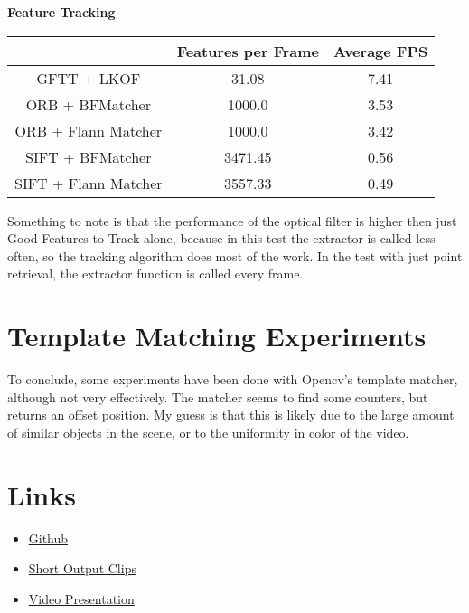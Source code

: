\documentclass[conference]{IEEEtran}
\begin{document}
\begin{center}
	\textbf{Feature Tracking}\\
	\begin{tabular}{||c c c||} 
	 \hline
	 & Features per Frame & Average FPS \\ [0.5ex] 
	 \hline\hline
	 GFTT + LKOF & 31.08 & 7.41 \\ 
	 \hline
	 ORB + BFMatcher & 1000.0 & 3.53 \\
	 \hline
	 ORB + Flann Matcher & 1000.0 & 3.42 \\
	 \hline
	 SIFT + BFMatcher & 3471.45 & 0.56 \\
	 \hline
	 SIFT + Flann Matcher & 3557.33 & 0.49 \\
	 \hline
	\end{tabular}
\end{center}

Something to note is that the performance of the optical filter is higher then just Good Features to Track alone, because in this test the extractor 
is called less often, so the tracking algorithm does most of the work. 
In the test with just point retrieval, the extractor function is called every frame.


\section{Template Matching Experiments}

To conclude, some experiments have been done with Opencv's template matcher, although not very effectively. 
The matcher seems to find some counters, but returns an offset position. My guess is that this is 
likely due to the large amount of similar objects in the scene, or to the uniformity in color of the video. 


\section{Links}

\begin{itemize}
    \item \href{https://github.com/lelepado01/Assignment2ComputerVision}{Github} 
    \item \href{https://drive.google.com/file/d/1OssPwOR97STaiHRiAeliSH2cpHP-4XCJ/view?usp=sharing}{Short Output Clips} 
    \item \href{https://drive.google.com/file/d/1r-y5-ALC4fAHzOlGfd5zgIg0w363ghtm/view?usp=sharing}{Video Presentation} 
\end{itemize}



\end{document}
